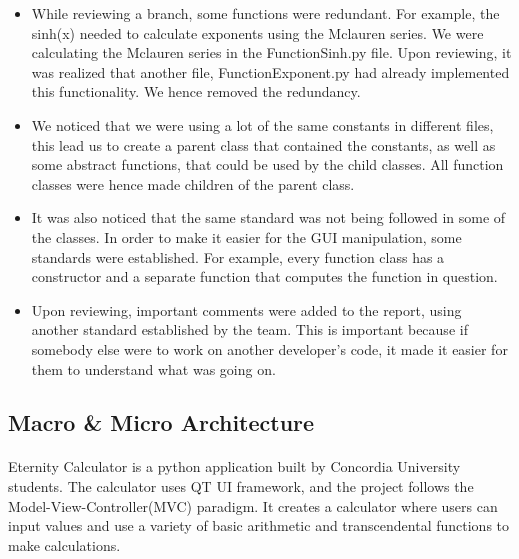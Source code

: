         \begin{itemize}
            \item While reviewing a branch, some functions were redundant. For example, the sinh(x) needed to calculate  exponents  using the Mclauren series. We were calculating the Mclauren series in the FunctionSinh.py file. Upon reviewing, it was realized that another file, FunctionExponent.py had already implemented this functionality. We hence removed the redundancy.

            \item We noticed that we were using a lot of the same constants in different files, this lead us to create a parent class that contained the constants, as well as some abstract functions, that could be used by the child classes. All function classes were hence made children of the parent class.

            \item It was also noticed that the same standard was not being followed in some of the classes. In order to make it easier for the GUI manipulation, some standards were established. For example, every function class has a constructor and a separate function that computes the function in question.

            \item Upon reviewing, important comments were added to the report, using another standard established by the team. This is important because if somebody else were to work on another developer’s code, it made it easier for them to understand what was going on.
        \end{itemize}

    \subsection{Macro \& Micro Architecture}
        \paragraph{}
        Eternity Calculator is a python application built by Concordia University students. The calculator uses QT UI framework, and the project follows the Model-View-Controller(MVC) paradigm. It creates a calculator where users can input values and use a variety of basic arithmetic and transcendental functions to make calculations.

